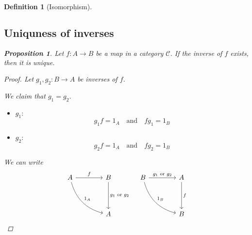 \documentclass{article}
\newtheorem{proposition}{Proposition}[section]
\newtheorem{definition}{Definition}[section]
\begin{document}
\begin{definition}[Isomorphism]
        \subsection{Uniquness of inverses}

        \begin{proposition}
            Let $f: A \to B$ be a map in a category $\mathcal{C}$. If the inverse of $f$ exists, then it is unique.
        \end{proposition}

        \begin{proof}
            Let $g_1, g_2: B \to A$ be inverses of $f$.

            We claim that $g_1 = g_2$.

            \begin{itemize}
                \item $g_1:$
                \[
                    g_1 f = 1_A \quad \text{and} \quad f g_1 = 1_B
                \]
                \item $g_2:$
                \[
                    g_2 f = 1_A \quad \text{and} \quad f g_2 = 1_B
                \]
            \end{itemize}

            We can write
            \[
                \begin{array}{c c} %
                    \begin{tikzcd}[column sep=4em, row sep=4em]
                        A  \arrow[r, "f"] \arrow[dr, bend right, "1_A"]
                        & B  \arrow[d, "g_1 \text{ or } g_2"]\\
                        & A
                    \end{tikzcd}
                    &
                    \begin{tikzcd}[column sep=4em, row sep=4em]
                        B  \arrow[r, "g_1 \text{ or } g_2"] \arrow[dr, bend right, "1_B"]
                        & A  \arrow[d, "f"]\\
                        & B
                    \end{tikzcd} \\
                \end{array}
            \]


\end{proof}
\end{definition}
\end{document}
